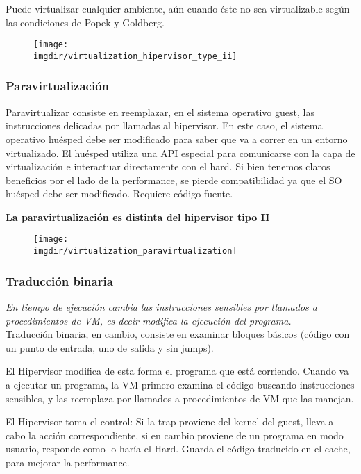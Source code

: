 \documentclass[a4paper, twoside]{article}
\newcommand{\imgdir}{../resources/images} %
\begin{document}
Puede virtualizar cualquier ambiente, aún cuando éste no sea virtualizable según las condiciones de Popek y Goldberg.

\begin{figure}[h]
	\centering
	\texttt{[image: \\imgdir/virtualization\_hipervisor\_type\_ii]}
	\label{fig:virtualizacion_hipervisor_tipo_ii}
\end{figure}

\subsubsection{Paravirtualización}
Paravirtualizar consiste en reemplazar, en el sistema operativo guest, las instrucciones delicadas por llamadas al hipervisor. En este caso, el sistema operativo huésped debe ser modificado para saber que va a correr en un entorno virtualizado. El huésped utiliza una API especial para comunicarse con la capa de virtualización e interactuar directamente con el hard. Si bien tenemos claros beneficios por el lado de la performance, se pierde compatibilidad ya que el SO huésped debe ser modificado. Requiere código fuente.

\textbf{La paravirtualización es distinta del hipervisor tipo II}

\begin{figure}[h]
	\centering
	\texttt{[image: \\imgdir/virtualization\_paravirtualization]}
	\label{fig:virtualizacion_paravirtualization}
\end{figure}

\subsubsection{Traducción binaria}
\textit{En tiempo de ejecución cambia las instrucciones sensibles por llamados a procedimientos de VM, es decir modifica la ejecución del programa.}\\

Traducción binaria, en cambio, consiste en examinar bloques básicos (código con un punto de entrada, uno de salida y sin jumps).

El Hipervisor modifica de esta forma el programa que está corriendo. Cuando va a ejecutar un programa, la VM primero examina el código buscando instrucciones sensibles, y las reemplaza por llamados a procedimientos de VM que las manejan.

El Hipervisor toma el control: Si la trap proviene del kernel del guest, lleva a cabo la acción correspondiente, si en cambio proviene de un programa en modo usuario, responde como lo haría el Hard.
Guarda el código traducido en el cache, para mejorar la performance.
\end{document}
